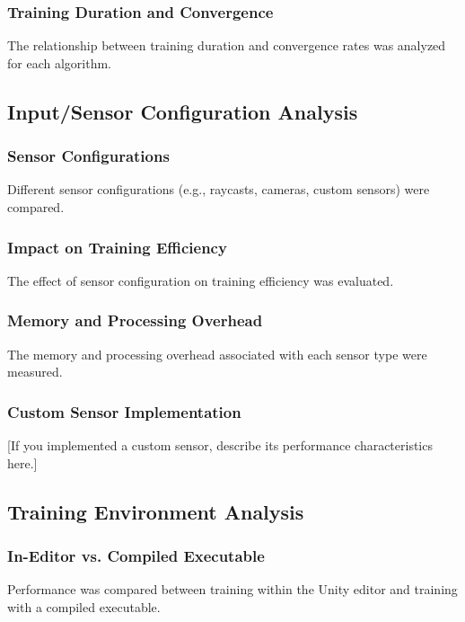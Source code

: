 \subsubsection{Training Duration and Convergence}
The relationship between training duration and convergence rates was analyzed for each algorithm.

\subsection{Input/Sensor Configuration Analysis}

\subsubsection{Sensor Configurations}
Different sensor configurations (e.g., raycasts, cameras, custom sensors) were compared.

\subsubsection{Impact on Training Efficiency}
The effect of sensor configuration on training efficiency was evaluated.

\subsubsection{Memory and Processing Overhead}
The memory and processing overhead associated with each sensor type were measured.

\subsubsection{Custom Sensor Implementation}
[If you implemented a custom sensor, describe its performance characteristics here.]

\subsection{Training Environment Analysis}

\subsubsection{In-Editor vs. Compiled Executable}
Performance was compared between training within the Unity editor and training with a compiled executable.

